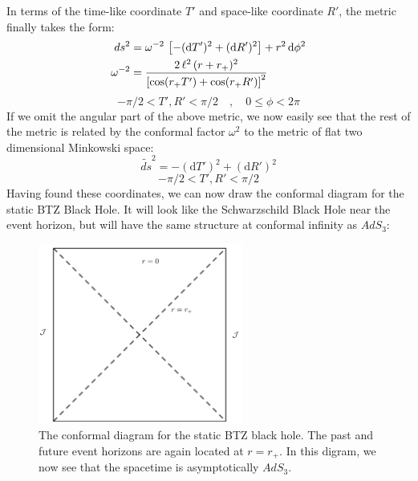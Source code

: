 %
%
In terms of the time-like coordinate $T'$ and space-like coordinate $R'$, the metric finally takes the form:
%
%
\begin{align}
ds^2 & = \omega^{-2} \, \left[- (\mathrm{d}T')^2 + (\mathrm{d}R')^2 \right]
+ r^2 \, \mathrm{d}\phi^2
\notag\\
\omega^{-2} & = \frac{2 \, \ell^2 \, (r + r_+)^2}{\left[ \cos(r_+ T') + \cos(r_+ R') \right]^2}
\end{align}
%
\begin{equation*}
-\pi/2 < T', R' < \pi/2
\quad , \quad
0 \leq \phi < 2 \pi
\end{equation*}
%
%
If we omit the angular part of the above metric, we now easily see that the rest of the metric is related by the conformal factor $\omega^2$ to the metric of flat two dimensional Minkowski space:
%
%
\begin{equation}
\tilde{ds}^2 = - (\mathrm{d}T')^2 + (\mathrm{d}R')^2
\end{equation}
\begin{equation*}
-\pi/2 < T', R' < \pi/2
\end{equation*}
%
%
Having found these coordinates, we can now draw the conformal diagram for the static BTZ Black Hole. It will look like the Schwarzschild Black Hole near the event horizon, but will have the same structure at conformal infinity as $AdS_3$:
%
%
\begin{figure}[h!]
%
\centering
%
\includegraphics[width=0.6\textwidth]{../pics/BTZ_stat_Pen.png}
%
\caption{The conformal diagram for the static BTZ black hole. The past and future event horizons are again located at $r=r_+$. In this digram, we now see that the spacetime is asymptotically $AdS_3$.}
%
\label{fig:pen_btz_static}
%
\end{figure}
%
%

